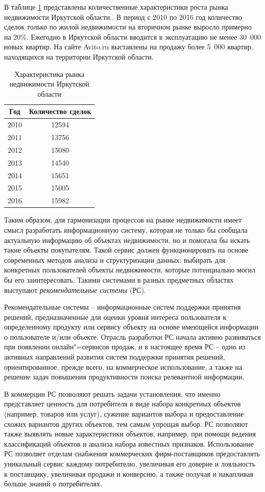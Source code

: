 \documentclass[a4paper,14pt,openany,final]{extreport} %
\begin{document}
В таблице \ref{tab:market-irk} представлены количественные характеристики роста рынка недвижимости Иркутской области.. В период с 2010 по 2016 год количество сделок только по жилой недвижимости на вторичном рынке выросло примерно на 20\%. Ежегодно в Иркутской области вводится в эксплуатацию не менее 30~000 новых квартир.
На сайте Avito.ru выставлены на продажу более 5~000 квартир, находящихся на территории Иркутской области.

\begin{table}[htb]
  \caption{Характеристика рынка недвижимости Иркутской области}
  \label{tab:market-irk}
  \centering
  \begin{tabular}{|c|c|}
    \hline
Год &
      Количество сделок \\
    \hline
2010 &
12594 \\
2011 &
13756 \\
2012 &
15080\\
2013 &
14540\\
2014 &
15651\\
2015 &
15005\\
2016 &
       15982\\
    \hline
\end{tabular}
\end{table}

Таким образом, для гармонизации процессов на рынке недвижимости имеет смысл разработать информационную систему, которая не только бы сообщала актуальную информацию об объектах недвижимости, но и помогала бы искать такие объекты покупателям.  Такой сервис должен функционировать на основе современных методов анализа и структуризации данных: выбирать для конкретных пользователей объекты недвижимости, которые потенциально могил бы его заинтересовать.  Такими системами в разных предметных областях выступают \emph{рекомендательные системы} (РС).

Рекомендательные системы \cite{b1} -- информационные систем поддержки принятия решений, предназначенные для оценки уровня интереса пользователя к определенному продукту или сервису объекту на основе имеющейся информации о пользователе и/или объекте. Отрасль разработки РС начала активно развиваться при появлении онлайн"=сервисов продаж, и в настоящее время РС – одно из активных направлений развития систем поддержки принятия решений, ориентированное, прежде всего, на коммерческое использование, а также на решение задач повышения продуктивности поиска релевантной информации.

В коммерции РС позволяют решать задачи установления, что именно представляет ценность для потребителя в виде набора конкретных объектов (например, товаров или услуг), сужение вариантов выбора и предоставление схожих вариантов других объектов, тем самым упрощая выбор. РС позволяют также выявлять новые характеристики объектов, например, при помощи ведения классификаций объектов и анализа набора известных признаков. Использование РС позволяет отделам снабжения коммерческих фирм-поставщиков предоставлять уникальный сервис каждому потребителю, увеличивая его доверие и лояльность к поставщику, увеличивая продажи и конверсию, а также получая и накапливая больше знаний о потребителях.
\end{document}
